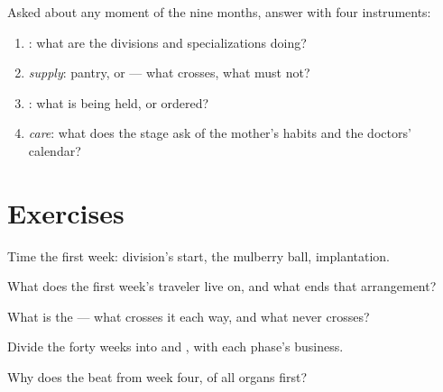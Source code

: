 \begin{method}\label{met:g8:from-egg-to-birth:explain}
Asked about any moment of the nine months, answer with
four instruments:
\begin{enumerate}
  \item \emph{}: what are the divisions and
        specializations doing?
  \item \emph{supply}: pantry, or  --- what
        crosses, what must not?
  \item \emph{}: what is being held, or ordered?
  \item \emph{care}: what does the stage ask of the
        mother's habits and the doctors' calendar?
\end{enumerate}
\end{method}

\section{Exercises}

\begin{exercise}[$\star$]\label{exo:g8:from-egg-to-birth:1}
Time the first week: division's start, the mulberry
ball, implantation.
\end{exercise}

\begin{exercise}[$\star$]\label{exo:g8:from-egg-to-birth:2}
What does the first week's traveler live on, and what
ends that arrangement?
\end{exercise}

\begin{exercise}[$\star$]\label{exo:g8:from-egg-to-birth:3}
What is the  --- what crosses it each way, and
what never crosses?
\end{exercise}

\begin{exercise}[$\star$]\label{exo:g8:from-egg-to-birth:4}
Divide the forty weeks into  and , with each
phase's business.
\end{exercise}

\begin{exercise}[$\star$]\label{exo:g8:from-egg-to-birth:5}
Why does the  beat from week four, of all organs
first?
\end{exercise}

